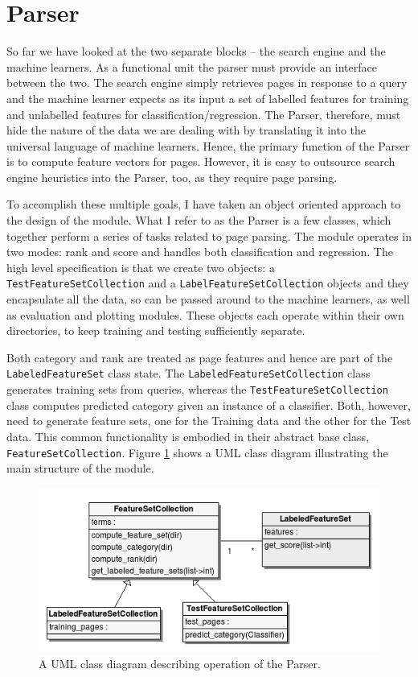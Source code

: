 \documentclass[11pt,twoside,notitlepage]{report}
\begin{document}
\section{Parser}

So far we have looked at the two separate blocks -- the search engine and the
machine learners. As a functional unit the parser must provide an interface
between the two. The search engine simply retrieves pages in response to a
query and the machine learner expects as its input a set of labelled features
for training and unlabelled features for classification/regression.  The
Parser, therefore, must hide the nature of the data we are dealing with by
translating it into the universal language of machine learners. Hence, the
primary function of the Parser is to compute feature vectors for pages.
However, it is easy to outsource search engine heuristics into the Parser, too,
as they require page parsing. 

To accomplish these multiple goals, I have
taken an object oriented approach to the design of the module. What I refer to
as the Parser is a few classes, which together perform a series of tasks
related to page parsing.  The module operates in two modes: rank and score and
handles both classification and regression. The high level specification is
that we create two objects: a \texttt{TestFeatureSetCollection} and a
\texttt{LabelFeatureSetCollection} objects and they encapsulate all the data,
so can be passed around to the machine learners, as well as evaluation and
plotting modules. These objects each operate within their own directories, to
keep training and testing sufficiently separate.

Both category and rank are
treated as page features and hence are part of the \texttt{LabeledFeatureSet}
class state.  The \texttt{LabeledFeatureSetCollection} class generates training
sets from queries, whereas the \texttt{TestFeatureSetCollection} class computes
predicted category given an instance of a classifier. Both, however, need to
generate feature sets, one for the Training data and the other for the Test
data. This common functionality is embodied in their abstract base class,
\texttt{FeatureSetCollection}.  Figure \ref{uml} shows a UML class diagram
illustrating the main structure of the module.

\begin{figure}
\centering
\includegraphics[scale=0.5]{figs/uml.png}
\caption{A UML class diagram describing operation of the Parser.}
\label{uml}
\end{figure}
\end{document}
